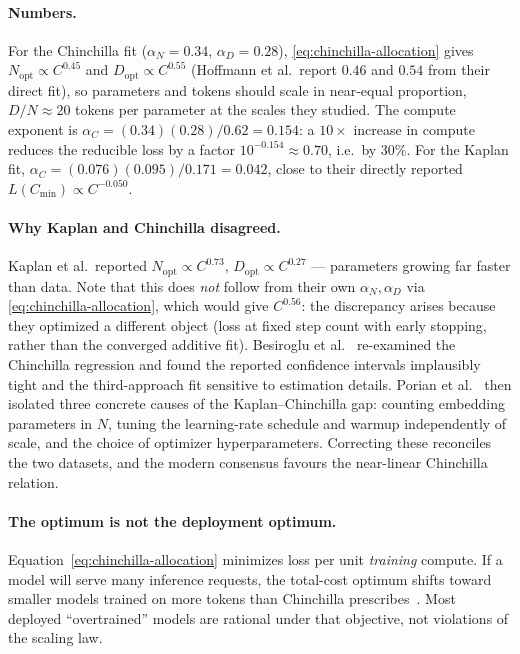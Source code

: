 \documentclass[11pt,a4paper]{article}
\theoremstyle{definition}
\begin{document}
\paragraph{Numbers.} For the Chinchilla fit ($\alpha_N=0.34$, $\alpha_D=0.28$), \eqref{eq:chinchilla-allocation} gives $N_{\mathrm{opt}}\propto C^{0.45}$ and $D_{\mathrm{opt}}\propto C^{0.55}$ (Hoffmann et al.\ report $0.46$ and $0.54$ from their direct fit), so parameters and tokens should scale in near-equal proportion, $D/N \approx 20$ tokens per parameter at the scales they studied. The compute exponent is $\alpha_C = (0.34)(0.28)/0.62 = 0.154$: a $10\times$ increase in compute reduces the reducible loss by a factor $10^{-0.154} \approx 0.70$, i.e.\ by $30\%$. For the Kaplan fit, $\alpha_C = (0.076)(0.095)/0.171 = 0.042$, close to their directly reported $L(C_{\min}) \propto C^{-0.050}$.

\paragraph{Why Kaplan and Chinchilla disagreed.} Kaplan et al.\ reported $N_{\mathrm{opt}}\propto C^{0.73}$, $D_{\mathrm{opt}}\propto C^{0.27}$ --- parameters growing far faster than data. Note that this does \emph{not} follow from their own $\alpha_N,\alpha_D$ via \eqref{eq:chinchilla-allocation}, which would give $C^{0.56}$: the discrepancy arises because they optimized a different object (loss at fixed step count with early stopping, rather than the converged additive fit). Besiroglu et al.~\cite{besiroglu2024chinchilla} re-examined the Chinchilla regression and found the reported confidence intervals implausibly tight and the third-approach fit sensitive to estimation details. Porian et al.~\cite{porian2024resolving} then isolated three concrete causes of the Kaplan--Chinchilla gap: counting embedding parameters in $N$, tuning the learning-rate schedule and warmup independently of scale, and the choice of optimizer hyperparameters. Correcting these reconciles the two datasets, and the modern consensus favours the near-linear Chinchilla relation.

\paragraph{The optimum is not the deployment optimum.} Equation~\eqref{eq:chinchilla-allocation} minimizes loss per unit \emph{training} compute. If a model will serve many inference requests, the total-cost optimum shifts toward smaller models trained on more tokens than Chinchilla prescribes~\cite{sardana2024beyond}. Most deployed ``overtrained'' models are rational under that objective, not violations of the scaling law.
\end{document}

